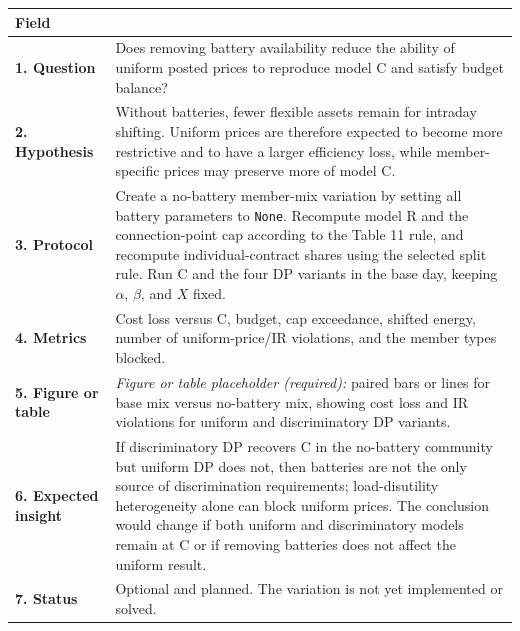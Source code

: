 \documentclass[]{article}
\begin{document}
\begin{longtable}[]{@{}ll@{}}
\toprule
Field & \\
\midrule
\midrule
\endhead
\textbf{1. Question} &
Does removing battery availability reduce the ability of uniform posted
prices to reproduce model C and satisfy budget balance? \\
\textbf{2. Hypothesis} &
Without batteries, fewer flexible assets remain for intraday shifting.
Uniform prices are therefore expected to become more restrictive and to
have a larger efficiency loss, while member-specific prices may preserve
more of model C. \\
\textbf{3. Protocol} &
Create a no-battery member-mix variation by setting all battery parameters
to \texttt{None}. Recompute model R and the connection-point cap
according to the Table 11 rule, and recompute individual-contract shares
using the selected split rule. Run C and the four DP variants in the base
day, keeping \(\alpha\), \(\beta\), and \(X\) fixed. \\
\textbf{4. Metrics} &
Cost loss versus C, budget, cap exceedance, shifted energy, number of
uniform-price/IR violations, and the member types blocked. \\
\textbf{5. Figure or table} &
\emph{Figure or table placeholder (required):} paired bars or lines for
base mix versus no-battery mix, showing cost loss and IR violations for
uniform and discriminatory DP variants. \\
\textbf{6. Expected insight} &
If discriminatory DP recovers C in the no-battery community but uniform
DP does not, then batteries are not the only source of discrimination
requirements; load-disutility heterogeneity alone can block uniform prices.
The conclusion would change if both uniform and discriminatory models
remain at C or if removing batteries does not affect the uniform result. \\
\textbf{7. Status} &
Optional and planned. The variation is not yet implemented or solved. \\
\bottomrule
\end{longtable}
\end{document}

